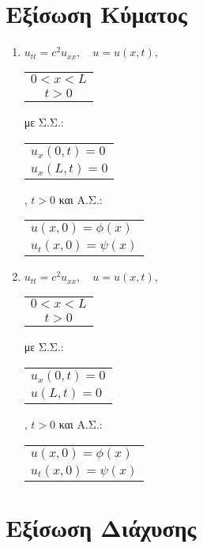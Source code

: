 \documentclass[a4paper,11pt]{report}
\begin{document}
\begin{center}
  \textcolor{Col1}{}
\end{center}


\section*{Εξίσωση Κύματος}%

\begin{enumerate}

  \item $ u_{tt}=c^{2}u_{xx}, \quad u=u(x,t), $ \quad 
    \begin{tabular}{c} $ 0<x<L $ \\ $ t>0 $ \end{tabular} 
    με Σ.Σ.: \begin{tabular}{l} $ u_{x}(0,t)=0 $ \\ $ u_{x}(L,t)=0 $ \end{tabular}, 
    $ t>0 $  και Α.Σ.: \begin{tabular}{l} $ u(x,0) = \phi(x) $ \\ $ u_{t}(x,0)= \psi(x) $
    \end{tabular}

  \item $ u_{tt}=c^{2}u_{xx}, \quad u=u(x,t), $ \quad 
    \begin{tabular}{c} $ 0<x<L $ \\ $ t>0 $ \end{tabular} 
    με Σ.Σ.: \begin{tabular}{l} $ u_{x}(0,t)=0 $ \\ $ u(L,t)=0 $ \end{tabular}, 
    $ t>0 $  και Α.Σ.: \begin{tabular}{l} $ u(x,0) = \phi(x) $ \\ $ u_{t}(x,0)= \psi(x) $
    \end{tabular}

\end{enumerate}


\section*{Εξίσωση Διάχυσης}%
\end{document}
